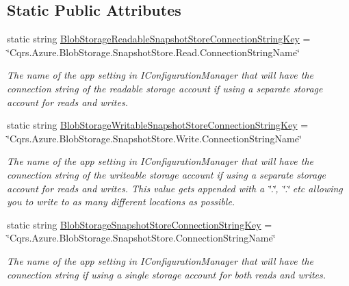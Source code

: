 \subsection*{Static Public Attributes}
\begin{DoxyCompactItemize}
\item 
static string \hyperlink{classCqrs_1_1Azure_1_1BlobStorage_1_1Events_1_1BlobStorageSnapshotStoreConnectionStringFactory_af194b50ec2e3de65c0207776491777d3_af194b50ec2e3de65c0207776491777d3}{Blob\+Storage\+Readable\+Snapshot\+Store\+Connection\+String\+Key} = \char`\"{}Cqrs.\+Azure.\+Blob\+Storage.\+Snapshot\+Store.\+Read.\+Connection\+String\+Name\char`\"{}
\begin{DoxyCompactList}\small\item\em The name of the app setting in I\+Configuration\+Manager that will have the connection string of the readable storage account if using a separate storage account for reads and writes. \end{DoxyCompactList}\item 
static string \hyperlink{classCqrs_1_1Azure_1_1BlobStorage_1_1Events_1_1BlobStorageSnapshotStoreConnectionStringFactory_a5b920e37137fbfb098eb74a7177c1de7_a5b920e37137fbfb098eb74a7177c1de7}{Blob\+Storage\+Writable\+Snapshot\+Store\+Connection\+String\+Key} = \char`\"{}Cqrs.\+Azure.\+Blob\+Storage.\+Snapshot\+Store.\+Write.\+Connection\+String\+Name\char`\"{}
\begin{DoxyCompactList}\small\item\em The name of the app setting in I\+Configuration\+Manager that will have the connection string of the writeable storage account if using a separate storage account for reads and writes. This value gets appended with a \char`\"{}.\char`\"{}, \char`\"{}.\char`\"{} etc allowing you to write to as many different locations as possible. \end{DoxyCompactList}\item 
static string \hyperlink{classCqrs_1_1Azure_1_1BlobStorage_1_1Events_1_1BlobStorageSnapshotStoreConnectionStringFactory_a9638ce6d0077def1e742b688e4581874_a9638ce6d0077def1e742b688e4581874}{Blob\+Storage\+Snapshot\+Store\+Connection\+String\+Key} = \char`\"{}Cqrs.\+Azure.\+Blob\+Storage.\+Snapshot\+Store.\+Connection\+String\+Name\char`\"{}
\begin{DoxyCompactList}\small\item\em The name of the app setting in I\+Configuration\+Manager that will have the connection string if using a single storage account for both reads and writes. \end{DoxyCompactList}\item 

\end{DoxyCompactItemize}
